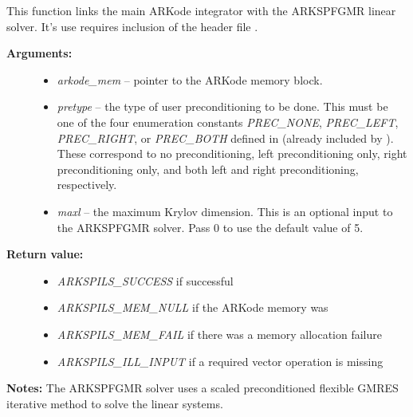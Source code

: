 \documentclass[letterpaper,10pt,english]{sphinxmanual}
\begin{document}

\begin{fulllineitems}
\label{c_interface/User_callable:c.ARKSpfgmr}
This function links the main ARKode integrator with the ARKSPFGMR
linear solver.  It's use requires inclusion of the header file
.
\begin{description}
\item[{\textbf{Arguments:}}] \leavevmode\begin{itemize}
\item {} 
\emph{arkode\_mem} -- pointer to the ARKode memory block.

\item {} 
\emph{pretype} -- the type of user preconditioning to be done.  This
must be one of the four enumeration constants \emph{PREC\_NONE},
\emph{PREC\_LEFT}, \emph{PREC\_RIGHT}, or \emph{PREC\_BOTH} defined in
 (already included by
). These correspond to no preconditioning,
left preconditioning only, right preconditioning only, and
both left and right preconditioning, respectively.

\item {} 
\emph{maxl} -- the maximum Krylov dimension. This is an optional input
to the ARKSPFGMR solver. Pass 0 to use the default value of 5.

\end{itemize}

\item[{\textbf{Return value:}}] \leavevmode\begin{itemize}
\item {} 
\emph{ARKSPILS\_SUCCESS} if successful

\item {} 
\emph{ARKSPILS\_MEM\_NULL}  if the ARKode memory was 

\item {} 
\emph{ARKSPILS\_MEM\_FAIL}  if there was a memory allocation failure

\item {} 
\emph{ARKSPILS\_ILL\_INPUT} if a required vector operation is missing

\end{itemize}

\end{description}

\textbf{Notes:} The ARKSPFGMR solver uses a scaled preconditioned
flexible GMRES iterative method to solve the linear systems.

\end{fulllineitems}
\end{document}
